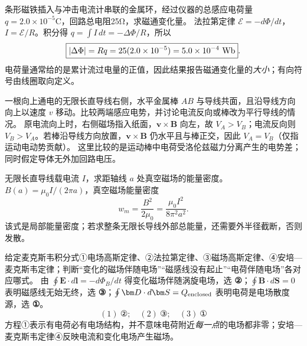 \problemtext 条形磁铁插入与冲击电流计串联的金属环，经过仪器的总感应电荷量 $q=2.0\times10^{-5}$C，回路总电阻25Ω，求磁通变化量。
\workings 法拉第定律 $\mathcal E=-d\Phi/dt$，$I=\mathcal E/R$。积分得 $q=\int I\,dt=-\Delta\Phi/R$，所以
\[\boxed{|\Delta\Phi|=Rq=25(2.0\times10^{-5})=5.0\times10^{-4}\ {\rm Wb}}.\]
\crosscheck 电荷量通常给的是累计流过电量的正值，因此结果报告磁通变化量的\emph{大小}；有向符号由线圈取向定义。

\problemtext 一根向上通电的无限长直导线右侧，水平金属棒 $AB$ 与导线共面，且沿导线方向向上以速度 $v$ 移动。比较两端感应电势，并讨论电流反向或棒改为平行导线的情况。
\workings 原电流向上时，右侧磁场指入纸面，$\bm v\times\bm B$ 向左，故 \textbf{$V_A>V_B$}；电流反向则 \textbf{$V_B>V_A$}。若棒沿导线方向放置，$\bm v\times\bm B$ 仍水平且与棒正交，因此 $\boxed{V_A=V_B}$（仅指运动电动势贡献）。
\crosscheck 这里比较的是运动棒中电荷受洛伦兹磁力分离产生的电势差；同时假定导体无外加回路电压。

\problemtext 无限长直导线载电流 $I$，求距轴线 $a$ 处真空磁场的能量密度。
\workings $B(a)=\mu_0I/(2\pi a)$，真空磁场能量密度
\[\boxed{w_m=\frac{B^2}{2\mu_0}=\frac{\mu_0I^2}{8\pi^2a^2}}.\]
\crosscheck 该式是局部能量密度；若求整条无限长导线外部总能量，还需要外半径截断，否则发散。

\problemtext 给定麦克斯韦积分式①电场高斯定律、②法拉第定律、③磁场高斯定律、④安培—麦克斯韦定律；判断“变化的磁场伴随电场”“磁感线没有起止”“电荷伴随电场”各对应哪式。
\workings 由 $\oint\bm E\cdot d\bm l=-d\Phi_B/dt$ 得变化磁场伴随涡旋电场，选 \textbf{②}；$\oint\bm B\cdot d\bm S=0$ 表明磁感线无始无终，选 \textbf{③}；$\oint\bm D\cdot d\bm S=Q_{\rm enclosed}$ 表明电荷是电场散度源，选 \textbf{①}。
\[\boxed{(1)\ \text{②};\quad(2)\ \text{③};\quad(3)\ \text{①}}\]
\crosscheck 方程①表示有电荷必有电场结构，并不意味电荷附近\emph{每一点}的电场都非零；安培—麦克斯韦定律④反映电流和变化电场产生磁场。
